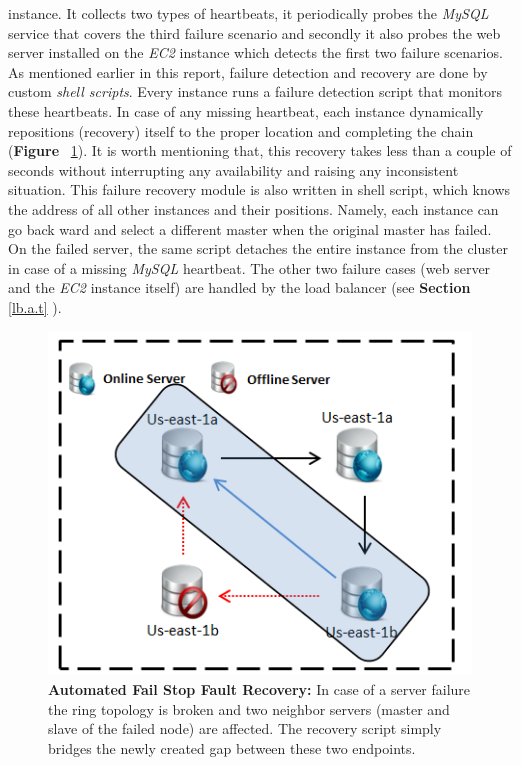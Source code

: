 \documentclass[12pt]{article}
\begin{document}
instance. It collects two types of heartbeats, it periodically probes the
\emph{MySQL} service that covers the third failure scenario and secondly it also
probes the web server installed on the \emph{EC2} instance which detects the
first two failure scenarios. As mentioned earlier in this report, failure
detection and recovery are done by custom \emph{shell scripts}. Every instance
runs a failure detection script that monitors these heartbeats. In case of any
missing heartbeat, each instance dynamically repositions (recovery) itself to
the proper location and completing the chain (\textbf{Figure
}~\ref{fig:failurerecovery}). It is worth mentioning that, this recovery takes
less than a couple of seconds without interrupting any availability and raising
any inconsistent situation. This failure recovery module is also written in
shell script, which knows the address of all other instances and their
positions. Namely, each instance can go back ward and select a different master
when the original master has failed.  On the failed server, the same script
detaches the entire instance from the cluster in case of a missing \emph{MySQL}
heartbeat. The other two failure cases (web server and the \emph{EC2} instance
itself) are handled by the load balancer (see \textbf{Section} \ref{lb.a.t} ).
\begin{figure}[H]
\centering 
\includegraphics[scale=0.8]{Images/figure5.PNG}
\caption{\textbf{Automated Fail Stop Fault Recovery:} In case of a server
failure the ring topology is broken and two neighbor servers (master and slave of the failed node)
are affected. The recovery script simply bridges the newly created gap between
these two endpoints.} 
\label{fig:failurerecovery} 
\end{figure} 
\end{document}

